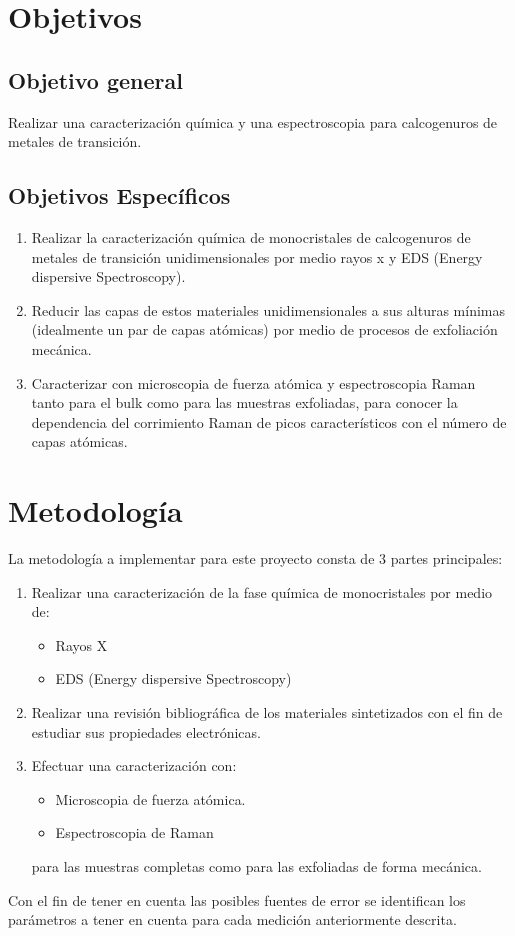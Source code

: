 \documentclass{article}
\begin{document}
\section{Objetivos}
\subsection{Objetivo general}

Realizar una caracterización química y una espectroscopia para calcogenuros de metales de transición.

\subsection{Objetivos Específicos}

\begin{enumerate}
    \item Realizar la caracterización química de monocristales de calcogenuros de metales de transición unidimensionales por medio rayos x y EDS (Energy dispersive Spectroscopy).
    \item Reducir las capas de estos materiales unidimensionales a sus alturas mínimas (idealmente un par de capas atómicas) por medio de procesos de exfoliación mecánica.
    \item Caracterizar con microscopia de fuerza atómica y espectroscopia Raman tanto para el bulk como para las muestras exfoliadas, para conocer la dependencia del corrimiento Raman de picos característicos con el número de capas atómicas.
\end{enumerate}

\section{Metodología}
La metodología a implementar para este proyecto consta de 3 partes principales:
\begin{enumerate}
    \item Realizar una caracterización de la fase química de monocristales por medio de:
    \begin{itemize}
        \item Rayos X
        \item EDS (Energy dispersive Spectroscopy)
    \end{itemize}
    \item Realizar una revisión bibliográfica de los materiales sintetizados con el fin de estudiar sus propiedades electrónicas.
    \item Efectuar una caracterización con:
    \begin{itemize}
        \item Microscopia de fuerza atómica.
        \item Espectroscopia de Raman
    \end{itemize}
    para las muestras completas como para las exfoliadas de forma mecánica.
\end{enumerate}
Con el fin de tener en cuenta las posibles fuentes de error se identifican los parámetros a tener en cuenta para cada medición anteriormente descrita.
\end{document}

